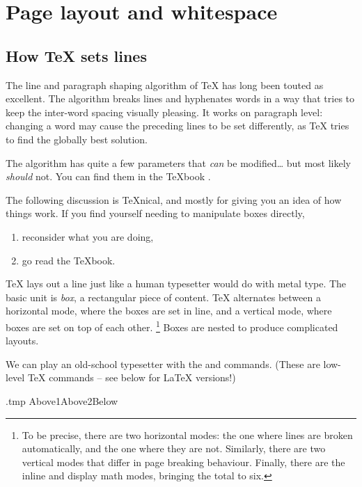 \chapter{Page layout and whitespace}\label{sec:layout}


%
%
%
\section{How \TeX{} sets lines}\label{sec:overfull}\label{sec:babel}

The line and paragraph shaping algorithm of \TeX{} has long been touted as excellent.
The algorithm breaks lines and hyphenates words in a way that tries to
keep the inter-word spacing visually pleasing.
It works on paragraph level: changing a word may cause the preceding lines to be set differently,
as \TeX{} tries to find the globally best solution.

\begin{technote}
The algorithm has quite a few parameters that \emph{can} be modified\dots{}
but most likely \emph{should} not.
You can find them in the \TeX book \cite{texbook}.
\end{technote}

\begin{warning}
The following discussion is \TeX nical, and mostly for giving you an idea of how things work.
If you find yourself needing to manipulate boxes directly,
\begin{enumerate}
    \item reconsider what you are doing,
    \item go read the \TeX book.
\end{enumerate}
\end{warning}


\TeX{} lays out a line just like a human typesetter would do with metal type.
The basic unit is \emph{box}, a rectangular piece of content.
\TeX{} alternates between a horizontal mode, where the boxes are set in line,
and a vertical mode, where boxes are set on top of each other.%
\footnote{To be precise, there are two horizontal modes:
the one where lines are broken automatically, and the one where they are not.
Similarly, there are two vertical modes that differ in page breaking behaviour.
Finally, there are the inline and display math modes, bringing the total to six.}
Boxes are nested to produce complicated layouts.

\begin{technote}
We can play an old-school typesetter with the  and  commands.
(These are low-level \TeX{} commands -- see below for \LaTeX{} versions!)
%
\begin{VerbatimOut}{\jobname.tmp}
\vbox{\hbox{\hbox{Above1}\hbox{Above2}}\hbox{Below}}
\end{VerbatimOut}
\ShowExampleBelow
\end{technote}

